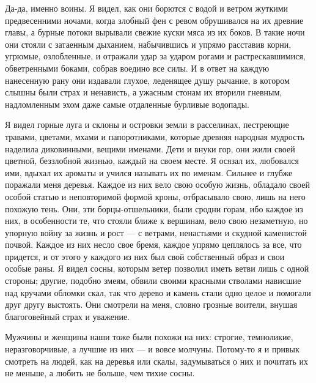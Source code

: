 Да-да, именно воины. Я видел, как они борются с водой и ветром жуткими
предвесенними  ночами, когда  злобный фен  с ревом  обрушивался на  их
древние главы, а бурные потоки вырывали свежие куски мяса из их боков.
В такие  ночи они  стояли с затаенным  дыханием, набычившись  и упрямо
расставив  корни,  угрюмые, озлобленные,  и  отражали  удар за  ударом
рогами  и растрескавшимися,  обветренными боками,  собрав воедино  все
силы.  И  в ответ  на  каждую  нанесенную  рану они  издавали  глухое,
леденящее душу  рычание, в  котором слышны были  страх и  ненависть, а
ужасным  стонам  их  вторили  гневным, надломленным  эхом  даже  самые
отдаленные бурливые водопады.

Я видел горные луга и склоны и островки земли в расселинах, пестреющие
травами,  цветами, мхами  и  папоротниками,  которые древняя  народная
мудрость наделила диковинными,  вещими именами. Дети и  внуки гор, они
жили своей цветной, беззлобной жизнью, каждый на своем месте. Я осязал
их,  любовался  ими,  вдыхал  их  ароматы  и  учился  называть  их  по
именам. Сильнее  и глубже  поражали меня деревья.  Каждое из  них вело
свою  особую  жизнь,  обладало  своей  особой  статью  и  неповторимой
формой кроны,  отбрасывало свою, лишь  на него похожую тень.  Они, эти
борцы-отшельники, были сродни горам, ибо  каждое из них, в особенности
те,  что стояли  ближе к  вершинам, вело  свою незаметную,  но упорную
войну за жизнь  и рост --- с ветрами, ненастьями  и скудной каменистой
почвой. Каждое  из них  несло свое бремя,  каждое упрямо  цеплялось за
все, что  придется, и от этого  у каждого из них  был свой собственный
образ и свои особые раны. Я  видел сосны, которым ветер позволил иметь
ветви  лишь с  одной  стороны; другие,  подобно  змеям, обвили  своими
красными стволами  нависшие над кручами  обломки скал, так  что дерево
и  камень  стали  одно  целое  и помогали  друг  другу  выстоять.  Они
смотрели на меня, словно грозные воители, внушая благоговейный страх и
уважение.

Мужчины и женщины  наши тоже были похожи на  них: строгие, темноликие,
неразговорчивые, а  лучшие из них ---  и вовсе молчуны. Потому-то  я и
привык смотреть на людей, как на деревья или скалы, задумываться о них
и почитать их не меньше, а любить не больше, чем тихие сосны.

